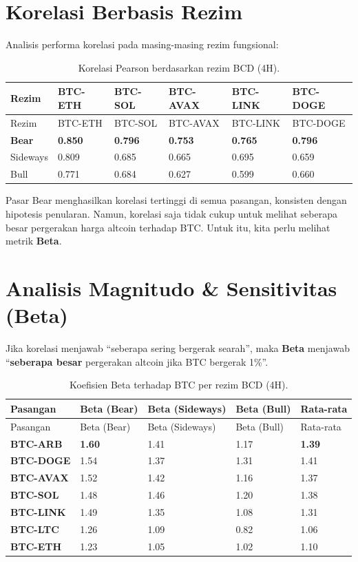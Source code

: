 \documentclass[
  11pt,
  a4paper,
]{article}
\begin{document}
\section{Korelasi Berbasis Rezim}\label{korelasi-berbasis-rezim}

Analisis performa korelasi pada masing-masing rezim fungsional:

\begin{longtable}[]{@{}llllll@{}}
\caption{Korelasi Pearson berdasarkan rezim BCD
(4H).}\label{tbl-regime-corr}\tabularnewline
\toprule\noalign{}
Rezim & BTC-ETH & BTC-SOL & BTC-AVAX & BTC-LINK & BTC-DOGE \\
\midrule\noalign{}
\endfirsthead
\toprule\noalign{}
Rezim & BTC-ETH & BTC-SOL & BTC-AVAX & BTC-LINK & BTC-DOGE \\
\midrule\noalign{}
\endhead
\bottomrule\noalign{}
\endlastfoot
\textbf{Bear} & \textbf{0.850} & \textbf{0.796} & \textbf{0.753} &
\textbf{0.765} & \textbf{0.796} \\
Sideways & 0.809 & 0.685 & 0.665 & 0.695 & 0.659 \\
Bull & 0.771 & 0.684 & 0.627 & 0.599 & 0.660 \\
\end{longtable}

Pasar Bear menghasilkan korelasi tertinggi di semua pasangan, konsisten
dengan hipotesis penularan. Namun, korelasi saja tidak cukup untuk
melihat seberapa besar pergerakan harga altcoin terhadap BTC. Untuk itu,
kita perlu melihat metrik \textbf{Beta}.

\section{Analisis Magnitudo \& Sensitivitas
(Beta)}\label{analisis-magnitudo-sensitivitas-beta}

Jika korelasi menjawab ``seberapa sering bergerak searah'', maka
\textbf{Beta} menjawab ``\textbf{seberapa besar} pergerakan altcoin jika
BTC bergerak 1\%''.

\begin{longtable}[]{@{}lllll@{}}
\caption{Koefisien Beta terhadap BTC per rezim BCD
(4H).}\label{tbl-beta}\tabularnewline
\toprule\noalign{}
Pasangan & Beta (Bear) & Beta (Sideways) & Beta (Bull) & Rata-rata \\
\midrule\noalign{}
\endfirsthead
\toprule\noalign{}
Pasangan & Beta (Bear) & Beta (Sideways) & Beta (Bull) & Rata-rata \\
\midrule\noalign{}
\endhead
\bottomrule\noalign{}
\endlastfoot
\textbf{BTC-ARB} & \textbf{1.60} & 1.41 & 1.17 & \textbf{1.39} \\
\textbf{BTC-DOGE} & 1.54 & 1.37 & 1.31 & 1.41 \\
\textbf{BTC-AVAX} & 1.52 & 1.42 & 1.16 & 1.37 \\
\textbf{BTC-SOL} & 1.48 & 1.46 & 1.20 & 1.38 \\
\textbf{BTC-LINK} & 1.49 & 1.35 & 1.08 & 1.31 \\
\textbf{BTC-LTC} & 1.26 & 1.09 & 0.82 & 1.06 \\
\textbf{BTC-ETH} & 1.23 & 1.05 & 1.02 & 1.10 \\
\end{longtable}
\end{document}
